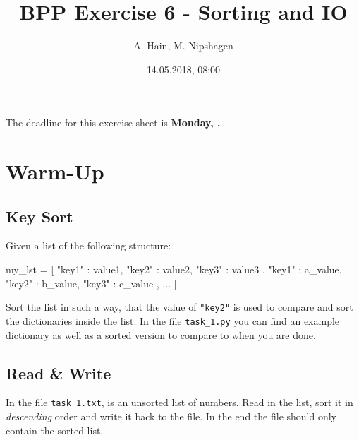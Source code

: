 
\usepackage{tikz}
\usetikzlibrary{arrows,automata}

\title{BPP Exercise 6 - Sorting and IO}
\author{A. Hain, M. Nipshagen}
\date{14.05.2018, 08:00}

\makeatletter
\let\thetitle\@title
\let\theauthor\@author
\let\thedate\@date
\makeatother





The deadline for this exercise sheet is \textbf{Monday, \thedate.}
%
%

\section{Warm-Up}

\subsection{Key Sort}
Given a list of the following structure:
\begin{python}
my_lst = [
  {
    "key1" : value1,
    "key2" : value2,
    "key3" : value3
  },
  {
    "key1" : a_value,
    "key2" : b_value,
    "key3" : c_value
  },
  ...
]
\end{python}
Sort the list in such a way, that the value of \texttt{"key2"} is used to compare and sort the dictionaries inside the list. In the file 
\texttt{task\_1.py} you can find an example dictionary as well as a sorted
version to compare to when you are done.
\\
\cprotect{}

\subsection{Read \& Write}
In the file \texttt{task\_1.txt}, is an unsorted list of numbers. Read in the list, sort it in \textit{descending} order and write it back to the file.
In the end the file should only contain the sorted list.\\
\cprotect{}

